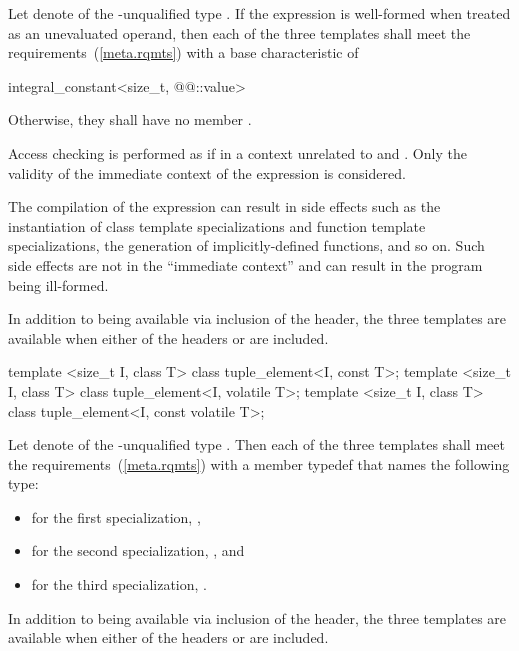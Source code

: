 \begin{itemdescr}
\pnum
Let  denote  of the \cv-unqualified type .
If the expression  is well-formed
when treated as an unevaluated operand, then each
of the three templates shall meet the  requirements~(\ref{meta.rqmts})
with a base characteristic of
\begin{codeblock}
integral_constant<size_t, @@::value>
\end{codeblock}
Otherwise, they shall have no member .

\pnum
Access checking is performed as if in a context
unrelated to  and .
Only the validity of the immediate context of the expression is considered.
\begin{note}
The compilation of the expression can result in side effects
such as the instantiation of class template specializations and
function template specializations, the generation of implicitly-defined functions, and so on.
Such side effects are not in the ``immediate context'' and
can result in the program being ill-formed.
\end{note}

\pnum
In addition to being available via inclusion of the  header,
the three templates are available when either of the headers  or
 are included.
\end{itemdescr}

%
\begin{itemdecl}
template <size_t I, class T> class tuple_element<I, const T>;
template <size_t I, class T> class tuple_element<I, volatile T>;
template <size_t I, class T> class tuple_element<I, const volatile T>;
\end{itemdecl}

\begin{itemdescr}
\pnum
Let  denote  of the \cv-unqualified type . Then
each of the three templates shall meet the 
requirements~(\ref{meta.rqmts}) with a member typedef  that names the following
type:

\begin{itemize}
\item
for the first specialization, ,
\item
for the second specialization, , and
\item
for the third specialization, .
\end{itemize}

\pnum
In addition to being available via inclusion of the  header,
the three templates are available when either of the headers  or
 are included.
\end{itemdescr}

